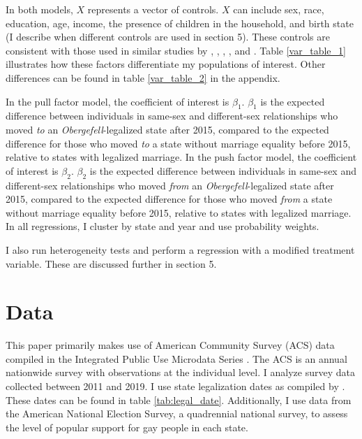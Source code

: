 \documentclass[12pt,letterpaper]{article}
\begin{document}
In both models, $X$ represents a vector of controls. $X$ can include sex, race, education, age, income, the presence of children in the household, and birth state (I describe when different controls are used in section 5). These controls are consistent with those used in similar studies by \citet{1}, \citet{3}, \citet{5}, \citet{7}, and \citet{12}. Table \ref{var_table_1} illustrates how these factors differentiate my populations of interest. Other differences can be found in table \ref{var_table_2} in the appendix.



In the pull factor model, the coefficient of interest is $\beta_1$. $\beta_1$ is the expected difference between individuals in same-sex and different-sex relationships who moved \textit{to} an \textit{Obergefell}-legalized state after 2015, compared to the expected difference for those who moved \textit{to} a state without marriage equality before 2015, relative to states with legalized marriage. In the push factor model, the coefficient of interest is $\beta_2$. $\beta_2$ is the expected difference between individuals in same-sex and different-sex relationships who moved \textit{from} an \textit{Obergefell}-legalized state after 2015, compared to the expected difference for those who moved \textit{from} a state without marriage equality before 2015, relative to states with legalized marriage. In all regressions, I cluster by state and year and use probability weights.

I also run heterogeneity tests and perform a regression with a modified treatment variable. These are discussed further in section 5.

\section{Data}

This paper primarily makes use of American Community Survey (ACS) data compiled in the Integrated Public Use Microdata Series \citep{28}. The ACS is an annual nationwide survey with observations at the individual level. I analyze survey data collected between 2011 and 2019. I use state legalization dates as compiled by \citet{27}. These dates can be found in table \ref{tab:legal_date}. Additionally, I use data from the American National Election Survey, a quadrennial national survey, to assess the level of popular support for gay people in each state.


\end{document}
